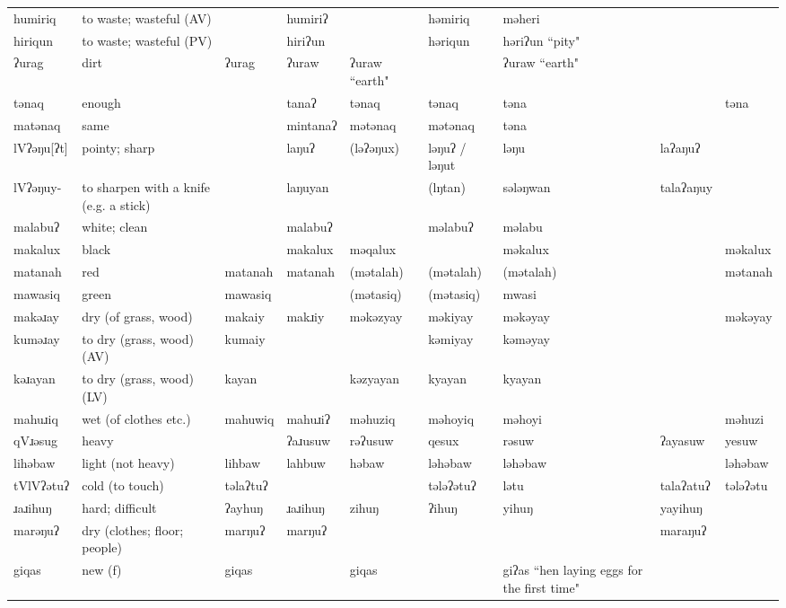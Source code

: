\begin{landscape}
\begin{longtable}{*{9}{>{\raggedright\arraybackslash}p{}}}
\text{*}humiriq & to waste; wasteful (AV) &  & humiriʔ &  & həmiriq & məheri &  & \\
\text{*}hiriqun & to waste; wasteful (PV) &  & hiriʔun &  & həriqun & həriʔun ``pity" &  & \\
\text{*}ʔurag & dirt & ʔurag & ʔuraw & ʔuraw ``earth" &  & ʔuraw ``earth" &  & \\
\text{*}tənaq & enough &  & tanaʔ & tənaq & tənaq & təna &  & təna\\
\text{*}matənaq & same &  & mintanaʔ & mətənaq & mətənaq & təna &  & \\
\text{*}lVʔəŋu[ʔt] & pointy; sharp &  & laŋuʔ & (ləʔəŋux) & ləŋuʔ / ləŋut & ləŋu & laʔaŋuʔ & \\
\text{*}lVʔəŋuy- & to sharpen with a knife (e.g. a stick) &  & laŋuyan &  & (lŋtan) & sələŋwan & talaʔaŋuy & \\
\text{*}malabuʔ & white; clean &  & malabuʔ &  & məlabuʔ & məlabu &  & \\
\text{*}makalux & black &  & makalux & məqalux &  & məkalux &  & məkalux\\
\text{*}matanah & red & matanah & matanah & (mətalah) & (mətalah) & (mətalah) &  & mətanah\\
\text{*}mawasiq & green & mawasiq &  & (mətasiq) & (mətasiq) & mwasi &  & \\
\text{*}makəɹay & dry (of grass, wood) & makaiy & makɹiy & məkəzyay & məkiyay & məkəyay &  & məkəyay\\
\text{*}kuməɹay & to dry (grass, wood) (AV) & kumaiy &  &  & kəmiyay & kəməyay &  & \\
\text{*}kəɹayan & to dry (grass, wood) (LV) & kayan &  & kəzyayan & kyayan & kyayan &  & \\
\text{*}mahuɹiq & wet (of clothes etc.) & mahuwiq & mahuɹiʔ & məhuziq & məhoyiq & məhoyi &  & məhuzi\\
\text{*}qVɹəsug & heavy &  & ʔaɹusuw & rəʔusuw & qesux & rəsuw & ʔayasuw & yesuw\\
\text{*}lihəbaw & light (not heavy) & lihbaw & lahbuw & həbaw & ləhəbaw & ləhəbaw &  & ləhəbaw\\
\text{*}tVlVʔətuʔ & cold (to touch) & təlaʔtuʔ &  &  & tələʔətuʔ & lətu & talaʔatuʔ & tələʔətu\\
\text{*}ɹaɹihuŋ & hard; difficult & ʔayhuŋ & ɹaɹihuŋ & zihuŋ & ʔihuŋ & yihuŋ & yayihuŋ & \\
\text{*}marəŋuʔ & dry (clothes; floor; people) & marŋuʔ & marŋuʔ &  &  &  & maraŋuʔ & \\
\text{*}giqas & new (f) & giqas &  & giqas &  & giʔas ``hen laying eggs for the first time" &  & \\

\end{longtable}
\end{landscape}
